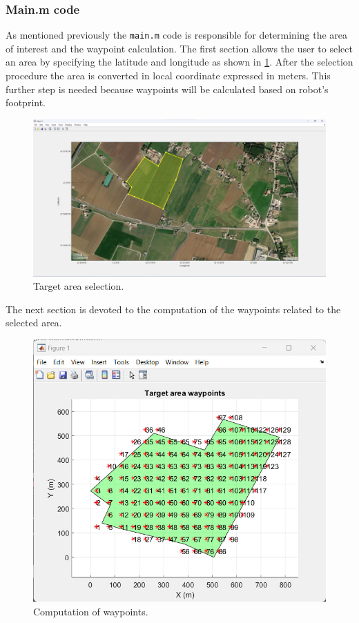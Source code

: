 \subsubsection*{Main.m code}
As mentioned previously the \texttt{main.m} code is responsible for determining the area of interest and the waypoint calculation.
The first section allows the user to select an area by specifying the latitude and longitude as shown in \ref{fig:target_area_selection}. After the selection procedure the area is converted in local coordinate expressed in meters. This further step is needed because waypoints will be calculated based on robot's footprint.

\begin{figure}[hbt!]
	\centering
	\includegraphics[width=\linewidth]{images/target_area_selection}
	\caption{Target area selection.}
	\label{fig:target_area_selection}
\end{figure}

The next section is devoted to the computation of the waypoints related to the selected area.

\begin{figure}[hbt!]
	\centering
	\includegraphics[width=.75\linewidth]{images/waypoints_calculation}
	\caption{Computation of waypoints.}
\end{figure}

